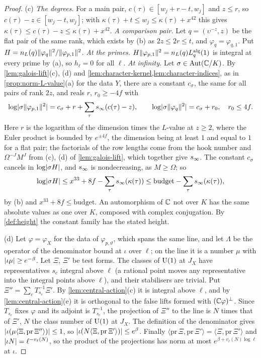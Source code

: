 \begin{proof}
(c) \emph{The degrees.} For a main pair, $c(\tau)\in[w_j+r-t,w_j]$ and $z\le r$, so $c(\tau)-z\in[w_j-t,w_j]$; with $\kappa(\tau)+t\le w_j\le\kappa(\tau)+x^{42}$ this gives $\kappa(\tau)\le c(\tau)-z\le\kappa(\tau)+x^{42}$. \emph{A comparison pair.} Let
$q=(\upsilon^{-z},z)$ be the flat pair of the same rank, which exists by (b) as $2z\le2r\le t$, and $\varphi_q=\varphi_{q,1}$. Put $H=n_L(q)\lVert \varphi_q\rVert^2/\lVert \varphi_{p,1}\rVert^2$. \emph{At the primes.} $H\lVert \varphi_{p,1}\rVert^2=n_L(q)L^{\rm alg}_q(1)$ is integral at
every prime by (a), so $h_\ell=0$ for all $\ell$. \emph{At infinity.} Let $\sigma\in\mathrm{Aut}(\mathbb{C}/K)$. By \cref{lem:galois-lift}(c), (d) and \cref{lem:character-kernel,lem:character-indices}, as in \cref{prop:norm-L-value}(a) for the data $Y$, there are a
constant $c_\sigma$, the same for all pairs of rank $2z$, and reals $r$, $r_0\ge-4f$ with
\[
  \log\lvert \sigma\lVert \varphi_{p,1}\rVert^2\rvert=c_\sigma+r+\sum_\tau s_\infty(c(\tau)-z),\qquad\log\lvert \sigma\lVert \varphi_q\rVert^2\rvert=c_\sigma+r_0,\quad r_0\le4f.
\]
Here $r$ is the logarithm of the dimension times the $L$-value at $z\ge2$, where the Euler product is bounded by $e^{\pm4f}$, the dimension being at least $1$ and equal to $1$ for a flat pair; the factorials of the row lengths come
from the hook number and $\Omega^{-J}M^J$ from (c), (d) of \cref{lem:galois-lift}, which together give $s_\infty$. The constant $c_\sigma$ cancels in $\log\lvert \sigma H\rvert$, and $s_\infty$ is nondecreasing, as $M\ge\Omega$; so
\[
  \log\lvert \sigma H\rvert\le x^{33}+8f-\sum_\tau s_\infty(\kappa(\tau))\le\mathrm{budget}-\sum_\tau s_\infty(\kappa(\tau)),
\]
by (b) and $x^{33}+8f\le\mathrm{budget}$. An automorphism of $\mathbb{C}$ not over $K$ has the same absolute values as one over $K$, composed with complex conjugation. By \cref{def:height} the constant family has the stated height.

(d) Let $\varphi=\varphi_{X}$ for the data of $\varphi_{p,\vartheta}$, which spans the same line, and let $\Lambda$ be the operator of the denominator bound at $\iota$ over $\ell$; on the line it is a number $\mu$ with $\lvert \iota\mu\rvert\ge e^{-\beta}$.
Let $\Xi$, $\Xi'$ be test forms. The classes of $\operatorname{U}(1)$ at $J_X$ have representatives $s_c$ integral above $\ell$ (a rational point moves any representative into the integral points above $\ell$), and their stabilisers are
trivial. Put $\Xi''=\sum_cT_{s_c}^{-1}\Xi'$. By \cref{lem:central-action}(c) it is integral above $\ell$, and by \cref{lem:central-action}(e) it is orthogonal to the false lifts formed with $(\mathbb{C}\varphi)^\perp$. Since $T_{s_c}$ fixes $\varphi$ and
its adjoint is $T_{s_c}^{-1}$, the projection of $\Xi''$ to the line is $N$ times that of $\Xi'$, $N$ the class number of $\operatorname{U}(1)$ at $J_X$. The definition of the denominator gives $\lvert \iota(\mu\langle\Xi,\mathrm{pr}\,\Xi''\rangle)\rvert\le1$, so
$\lvert \iota(N\langle\Xi,\mathrm{pr}\,\Xi'\rangle)\rvert\le e^\beta$. Finally $\langle\mathrm{pr}\,\Xi,\mathrm{pr}\,\Xi'\rangle=\langle\Xi,\mathrm{pr}\,\Xi'\rangle$ and $\lvert \iota N\rvert=\ell^{-v_\ell(N)}$, so the product of the projections has norm at most $e^{\beta+v_\ell(N)\log\ell}$ at $\iota$.
\end{proof}

